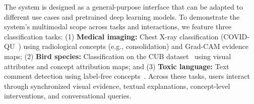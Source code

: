 \documentclass[sigconf,review,screen]{acmart}
\begin{document}



The system is designed as a general-purpose interface that can be adapted to different use cases and pretrained deep learning models. To demonstrate the system's multimodal scope across tasks and interactions, we feature three classification tasks: (1) \textbf{Medical imaging:} Chest X-ray classification (COVID-QU~\cite{chowdhury2020can}) using radiological concepts (e.g., consolidation) and Grad-CAM evidence maps; (2) \textbf{Bird species:} Classification on the CUB dataset~\cite{WahCUB_200_2011} using visual attributes and concept attribution maps; and (3) \textbf{Toxic language:} Text comment detection using label-free concepts~\cite{oikarinen_label-free_2022}. Across these tasks, users interact through synchronized visual evidence, textual explanations, concept-level interventions, and conversational queries.





\end{document}
